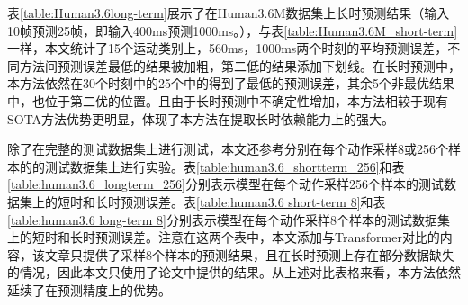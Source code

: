 表\ref{table:Human3.6long-term}展示了在Human3.6M数据集上长时预测结果（输入10帧预测25帧，即输入400ms预测1000ms。），与表\ref{table:Human3.6M_short-term}一样，本文统计了15个运动类别上，560ms，1000ms两个时刻的平均预测误差，不同方法间预测误差最低的结果被加粗，第二低的结果添加下划线。在长时预测中，本方法依然在30个时刻中的25个中的得到了最低的预测误差，其余5个非最优结果中，也位于第二优的位置。且由于长时预测中不确定性增加，本方法相较于现有SOTA方法优势更明显，体现了本方法在提取长时依赖能力上的强大。

除了在完整的测试数据集上进行测试，本文还参考\parencite{li2020dynamic, mao2019learning, martinez2017human,mao2020history}分别在每个动作采样8或256个样本的的测试数据集上进行实验。表\ref{table:human3.6_shortterm_256}和表\ref{table:human3.6_longterm_256}分别表示模型在每个动作采样256个样本的测试数据集上的短时和长时预测误差。表\ref{table:human3.6 short-term 8}和表\ref{table:human3.6 long-term 8}分别表示模型在每个动作采样8个样本的测试数据集上的短时和长时预测误差。注意在这两个表中，本文添加与Transformer\parencite{aksan2021spatio}对比的内容，该文章只提供了采样8个样本的预测结果，且在长时预测上存在部分数据缺失的情况，因此本文只使用了论文中提供的结果。从上述对比表格来看，本方法依然延续了在预测精度上的优势。

\clearpage

